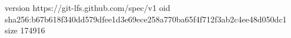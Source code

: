 version https://git-lfs.github.com/spec/v1
oid sha256:b67b618f340dd579dfee1d3e69ece258a770ba65f4f712f3ab2c4ee48d050dc1
size 174916
